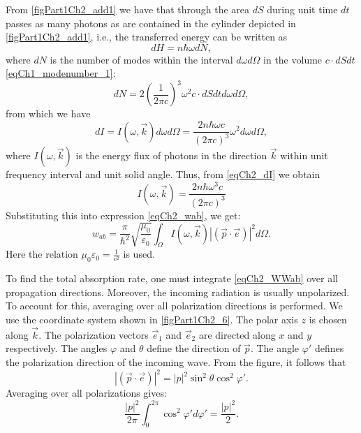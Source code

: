 From \autoref{figPart1Ch2_add1} we have that through the area $dS$ during unit
time $dt$ passes as many photons as are contained in the cylinder
depicted in \autoref{figPart1Ch2_add1}, i.e., the transferred energy can be written as
\[
dH = n \hbar \omega d N ,
\]
where $dN$ is the number of modes within the interval $d \omega d \Omega$ in
the volume $c \cdot dS  dt$ \eqref{eqCh1_modenumber_1}:
\[
d N = 2 \left(\frac{1}{2 \pi c} \right)^3 \omega^2 
c \cdot dS  dt
d \omega d \Omega,
\]
from which we have 
\begin{equation}
d I = I\left(\omega, \vec{k}\right) d \omega d \Omega = 
\frac{2 n \hbar \omega c}{\left(2 \pi c\right)^3}
\omega^2 d \omega d \Omega,
\label{eqCh2_dI}
\end{equation}
where $I\left(\omega, \vec{k}\right)$ is the energy flux of photons in the direction $\vec{k}$ within unit frequency interval and unit solid angle. Thus, from
\eqref{eqCh2_dI} we obtain 
\begin{equation}
I\left(\omega, \vec{k}\right) = 
\frac{2 n \hbar \omega^3 c}{\left(2 \pi c\right)^3}
\nonumber
\end{equation}
Substituting this into expression \eqref{eqCh2_wab}, we get:
\begin{equation}
w_{ab} = \frac{\pi}{\hbar^2}\sqrt{\frac{\mu_0}{\varepsilon_0}}
\int_{\Omega}I\left(\omega, \vec{k}\right)
\left|\left(\vec{p} \cdot \vec{e}\right)\right|^2
d \Omega.
\label{eqCh2_WWab}
\end{equation}
Here the relation $\mu_0 \varepsilon_0 = \frac{1}{c^2}$ is used.



To find the total absorption rate, one must
integrate \eqref{eqCh2_WWab} over all propagation directions.
Moreover, the incoming radiation is usually
unpolarized. To account for this, averaging over all polarization directions is performed.
We use the coordinate system shown in \autoref{figPart1Ch2_6}. The polar axis $z$
is chosen along $\vec{k}$. The polarization vectors $\vec{e}_1$ and $\vec{e}_2$ are directed along $x$ and $y$ respectively.
The angles $\varphi$ and $\theta$ define the direction of $\vec{p}$. 
The angle $\varphi'$ defines the polarization direction of the incoming wave. From the figure, it follows that
\[
\left|\left(\vec{p} \cdot \vec{e}\right)\right|^2 = 
\left|p\right|^2 \sin^2 \theta \cos^2 \varphi'. 
\]
Averaging over all polarizations gives: 
\begin{equation}
\frac{\left|p\right|^2}{2 \pi} \int_0^{2 \pi}
\cos^2 \varphi' d \varphi' = \frac{\left|p\right|^2}{2}.
\label{eqCh2_PolarMedian}
\end{equation}

